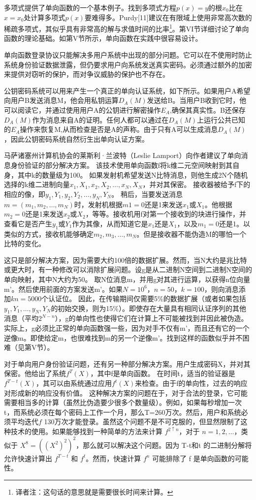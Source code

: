 \documentclass[]{article}
\begin{document}
	
	多项式提供了单向函数的一个基本例子。找到多项式方程$p(x)=y$的根$x_0$比在$x=x_0$处计算多项式$p(x)$要难得多。Purdy[11]建议在有限域上使用非常高次数的稀疏多项式，其似乎具有非常高的解与求值时间的比率\footnote{译者注：这句话的意思就是需要很长时间来计算。}。第VI节详细讨论了单向函数的理论基础。如第V节所示，单向函数在实践中很容易设计。
	
	
	单向函数登录协议只能解决多用户系统中出现的部分问题。它可以在不使用时防止系统身份验证数据泄露，但仍要求用户向系统发送真实密码。必须通过额外的加密来提供对窃听的保护，而对争议威胁的保护也不存在。
	
	公钥密码系统可以用来产生一个真正的单向认证系统，如下所示。如果用户A希望向用户B发送消息M，他会用私钥运算$D_A(M)$发送给B。当用户B收到它时，他可以阅读它，并通过使用用户A的公钥进行解密操作$E_A$,确保其真实性。B还保存$D_A(M)$作为消息来自A的证明。任何人都可以通过在$D_A(M)$上运行公共已知的$E_A$操作来恢复M,从而检查是否是A的声称。由于只有A可以生成消息$D_A(M)$，因此公钥密码系统自然衍生出单向认证方案。
	
	
	马萨诸塞州计算机协会的莱斯利·兰波特（Leslie Lamport）向作者建议了单向消息身份验证的部分解决方案。
	该技术使用单向函数f将k维二元空间映射到其自身，其中k的数量级为100。
	如果发射机希望发送N比特消息，则他生成2N个随机选择的k维二进制向量$x_1,X_1,x_2,X_2,\ldots,x_N,X_N$，并对其保密。
	接收器被给予f下的相应的像，即$y_1,Y_1,y_2,Y_2,\ldots,y_N,Y_N$。
	稍后，当要发送消息$m=(m_1,m_2,\ldots,m_N)$时，发射机根据$m1=0$还是1来发送$x_1$或$X_1$。他根据$m_2=0$还是1来发送$x_2$或$X_2$，等等。接收机用f对第一个接收到的块进行操作，并查看它是否产生$y_1$或$Y_1$作为其像，从而知道它是$x_1$还是$X_1$，以及$m_1=0$还是1。以类似的方式，接收机能够确定$m_2,m_3,\ldots,m_N$。但是接收器不能伪造M的哪怕一个比特的变化。
	
	
	这只是部分解决方案，因为需要大约100倍的数据扩展。然而，当N大约是兆比特或更大时，有一种修改可以消除扩展问题。设g是从二进制N空间到二进制N空间的单向映射，其中N大约为50。
	取N位消息m，并用g对其进行运算，以获得n位向量m'。然后使用前面的方案发送m'。如果$N=10^6$，$n=50$，$k=100$，则向消息添加$kn=5000$个认证位。
	因此，在传输期间仅需要5\%的数据扩展（或者如果包括$y_1,Y_1,\ldots,y_N,Y_N$的初始交换，则为15\%）。即使存在大量具有相同认证序列的其他消息（平均$2^{N-n}$），g的单向性也使得它们在计算上不可能被找到并因此被伪造。实际上，g必须比正常的单向函数强一些，因为对手不仅有m'，而且还有它的一个逆像m。即使给定m，也很难找到m的另一个逆像m'。找到这样的函数似乎并不困难（见第V节）。
	
	
	对于单向用户身份验证问题，还有另一种部分解决方案。用户生成密码X，并对其保密。他给出了系统$f^T(X)$，其中f是单向函数。
	在时间t，适当的验证器是$f^{T-t}(X)$，其可以由系统通过应用$f^t(X)$来检查。由于f的单向性，过去的响应对形成新的响应没有价值。
	这种解决方案的问题在于，对于合法的登录，它可能需要相当多的计算（虽然比伪造要少很多个数量级）。例如，如果每秒增加一次 t，而系统必须在每个密码上工作一个月，那么T=260万次。然后，用户和系统必须平均迭代$f$ 130万次才能登录。虽然这个问题不是不可克服的，但显然限制了这种技术的使用。如果能够找到一种简单的方法来计算 $f^{2\uparrow n}$，对于 $n=1,2,\ldots$，类似于 $X^8=((X^2)^2)^2$，那么就可以解决这个问题。因为 T-t和t 的二进制分解将允许快速计算出 $f^{T-t}$ 和 $f^t$。然而，快速计算 $f^n$ 可能排除了 f 是单向函数的可能性。
	
\end{document}
